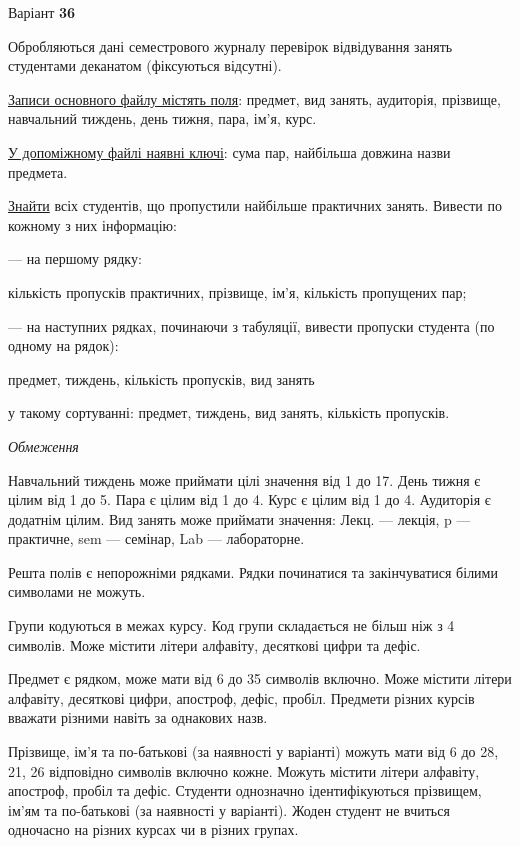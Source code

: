 \documentclass[11pt, ukrainian]{article}
\begin{document}
\par
\newpage
{\center Варіант  \No \textbf { 36 }\par}
\bigskip
Обробляються дані семестрового журналу перевірок відвідування занять студентами деканатом (фіксуються відсутні). 

\underline{Записи основного файлу містять поля}: предмет, вид занять, аудиторія, прізвище, навчальний тиждень, день тижня, пара, ім’я, курс.

\underline{У допоміжному файлі наявні ключі}: сума пар, найбільша довжина назви предмета.

\underline{Знайти} всіх студентів, що пропустили найбільше практичних занять. Вивести по кожному з них інформацію:\par
{\noindent}--- на першому рядку:\par
кількість пропусків практичних, прізвище, ім’я, кількість пропущених пар;

{\noindent}--- на наступних рядках, починаючи з табуляції, вивести пропуски студента (по одному на рядок):\par
предмет, тиждень, кількість пропусків, вид занять

{\noindent}у такому сортуванні: предмет, тиждень, вид занять, кількість пропусків.


\bigskip\textit{Обмеження}

Навчальний тиждень може приймати цілі значення від 1 до 17.
День тижня є цілим від 1 до 5. Пара є цілим від 1 до 4.
Курс є цілим від 1 до 4. Аудиторія є додатнім цілим.
Вид занять може приймати значення:
Лекц. --- лекція, p --- практичне, sem --- семінар, Lab --- лабораторне.

Решта полів є непорожніми рядками.
Рядки починатися та закінчуватися білими символами не можуть.

Групи кодуються в межах курсу.
Код групи складається не більш ніж з 4 символів.
Може містити літери алфавіту, десяткові цифри та дефіс.

Предмет є рядком, може мати від 6 до 35 символів включно.
Може містити літери алфавіту, десяткові цифри, апостроф, дефіс, пробіл.
Предмети різних курсів вважати різними навіть за однакових назв.

Прізвище, ім’я та по-батькові (за наявності у варіанті)
можуть мати від 6 до 28, 21, 26 відповідно символів включно кожне.
Можуть містити літери алфавіту, апостроф, пробіл та дефіс.
Студенти однозначно ідентифікуються прізвищем, ім’ям та по-батькові (за наявності у варіанті).
Жоден студент не вчиться одночасно на різних курсах чи в різних групах.
\end{document}
